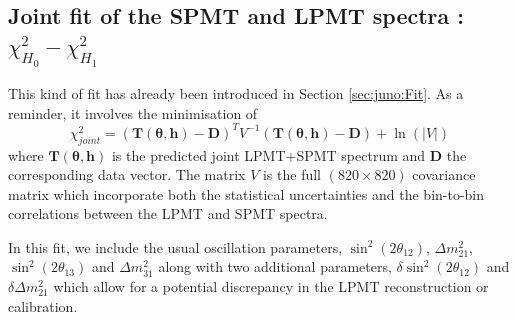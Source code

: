 \documentclass[../main.tex]{subfiles}
\begin{document}
%
%
%
%
%
%
%
%
%


\subsection{Joint fit of the SPMT and LPMT spectra : $\chi^2_{H_0}-\chi^2_{H_1}$}
\label{sec:joint_fit:hypothesis}

This kind of fit has already been introduced in Section \ref{sec:juno:Fit}.
As a reminder, it involves the minimisation of
\begin{equation}
  \chi^2_{joint}=\left(\bm{T}(\bm{\theta},\bm{h}) - \bm{D} \right)^T V^{-1} \left(\bm{T}(\bm{\theta},\bm{h}) - \bm{D}  \right) + \ln(|V|)
\end{equation}
where $\bm{T}(\bm{\theta},\bm{h})$ is the predicted joint LPMT+SPMT spectrum and $\bm{D}$ the corresponding data vector. The matrix $V$ is the full $(820 \times 820)$ covariance matrix which incorporate both the statistical uncertainties and the bin-to-bin correlations between the LPMT and SPMT spectra.

In this fit, we include the usual oscillation parameters, $\sin^2 (2 \theta_{12})$, $\Delta m^2_{21}$, $\sin^2 (2\theta_{13})$ and $\Delta m^2_{31}$ along with two additional parameters, $\delta \sin^2(2\theta_{12})$ and $\delta \Delta m^2_{21}$ which allow for a potential discrepancy in the LPMT reconstruction or calibration.
\end{document}
